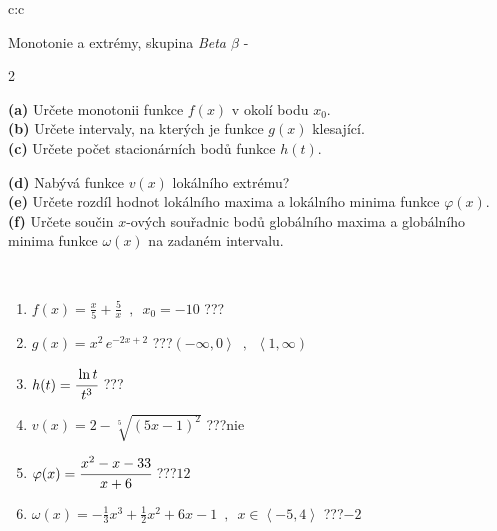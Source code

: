 \documentclass[10pt]{report}
\begin{document}
\newpage
\thispagestyle{empty}
\begin{tabular}{c:c}
\begin{minipage}[c][104.5mm][t]{0.5\linewidth}
\begin{center}
\vspace{7mm}
{\huge Monotonie a extrémy, skupina \textit{Beta $\beta$} -}\\[5mm]
\begin{minipage}{0.95\linewidth}
\begin{center}
{\small \begin{multicols}{2} \raggedright
\textbf{(a)} Určete monotonii funkce \(f(x)\) v okolí bodu \(x_0\). \\[1mm]
\textbf{(b)} Určete intervaly, na kterých je funkce \(g(x)\) klesající. \\[1mm]
\textbf{(c)} Určete počet stacionárních bodů funkce \(h(t)\). \par \columnbreak
\textbf{(d)} Nabývá funkce \(v(x)\) lokálního extrému? \\[1mm]
\textbf{(e)} Určete rozdíl hodnot lokálního maxima a lokálního minima funkce \(\varphi(x)\). \\[1mm]
\textbf{(f)} Určete součin \(x\)-ových souřadnic bodů globálního maxima a globálního minima funkce \(\omega(x)\) na zadaném intervalu. \\[1mm]
\end{multicols}
}
\end{center}
\end{minipage}
\\[4mm]
\begin{minipage}{0.79\linewidth}
\begin{center}
\begin{varwidth}{\linewidth}
\begin{enumerate}
\normalsize
\item $f(x)=\frac{x}{5}+\frac{5}{x} \enspace , \enspace x_0=-10$\quad \dotfill\; ???\;\dotfill \quad {}
\item $g(x)=x^2\, e^{-2x+2}$\quad \dotfill\; ???\;\dotfill \quad $\left(-\infty , 0\right\rangle\enspace , \enspace \left\langle1 , \infty\right)$
\item $h(t)=\cfrac{\ln t}{t^3}$\quad \dotfill\; ???\;\dotfill {}
\item $v(x)=2-\sqrt[5]{(5x-1)^2}$\quad \dotfill\; ???\;\dotfill \quad $\text{nie}$
\item $\varphi(x)=\cfrac{x^2-x-33}{x+6}$\quad \dotfill\; ???\;\dotfill \quad $12$
\item $\omega(x)=-\frac{1}{3}x^3+\frac{1}{2}x^2+6x-1 \enspace , \enspace x\in\left\langle-5 , 4\right\rangle$\quad \dotfill\; ???\;\dotfill \quad $-2$

\end{enumerate}
\end{varwidth}
\end{center}
\end{minipage}
\end{center}
\end{minipage}
\end{tabular}
\end{document}
